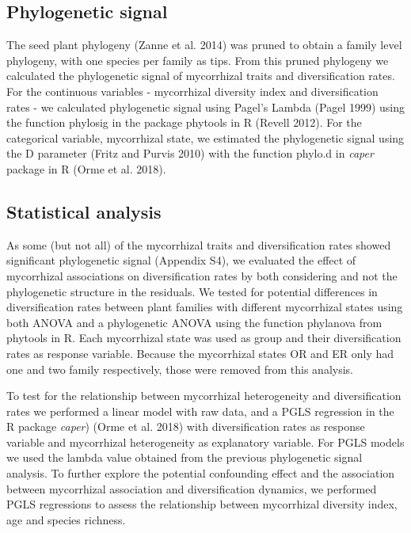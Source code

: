 \documentclass[
  12pt,
]{article}
\begin{document}
\hypertarget{phylogenetic-signal}{%
\subsection{Phylogenetic signal}\label{phylogenetic-signal}}

The seed plant phylogeny (Zanne et al. 2014) was pruned to obtain a
family level phylogeny, with one species per family as tips. From this
pruned phylogeny we calculated the phylogenetic signal of mycorrhizal
traits and diversification rates. For the continuous variables -
mycorrhizal diversity index and diversification rates - we calculated
phylogenetic signal using Pagel's Lambda (Pagel 1999) using the function
phylosig in the package phytools in R (Revell 2012). For the categorical
variable, mycorrhizal state, we estimated the phylogenetic signal using
the D parameter (Fritz and Purvis 2010) with the function phylo.d in
\emph{caper} package in R (Orme et al. 2018).

\hypertarget{statistical-analysis}{%
\subsection{Statistical analysis}\label{statistical-analysis}}

As some (but not all) of the mycorrhizal traits and diversification
rates showed significant phylogenetic signal (Appendix S4), we evaluated
the effect of mycorrhizal associations on diversification rates by both
considering and not the phylogenetic structure in the residuals. We
tested for potential differences in diversification rates between plant
families with different mycorrhizal states using both ANOVA and a
phylogenetic ANOVA using the function phylanova from phytools in R. Each
mycorrhizal state was used as group and their diversification rates as
response variable. Because the mycorrhizal states OR and ER only had one
and two family respectively, those were removed from this analysis.

To test for the relationship between mycorrhizal heterogeneity and
diversification rates we performed a linear model with raw data, and a
PGLS regression in the R package \emph{caper}) (Orme et al. 2018) with
diversification rates as response variable and mycorrhizal heterogeneity
as explanatory variable. For PGLS models we used the lambda value
obtained from the previous phylogenetic signal analysis. To further
explore the potential confounding effect and the association between
mycorrhizal association and diversification dynamics, we performed PGLS
regressions to assess the relationship between mycorrhizal diversity
index, age and species richness.
\end{document}
